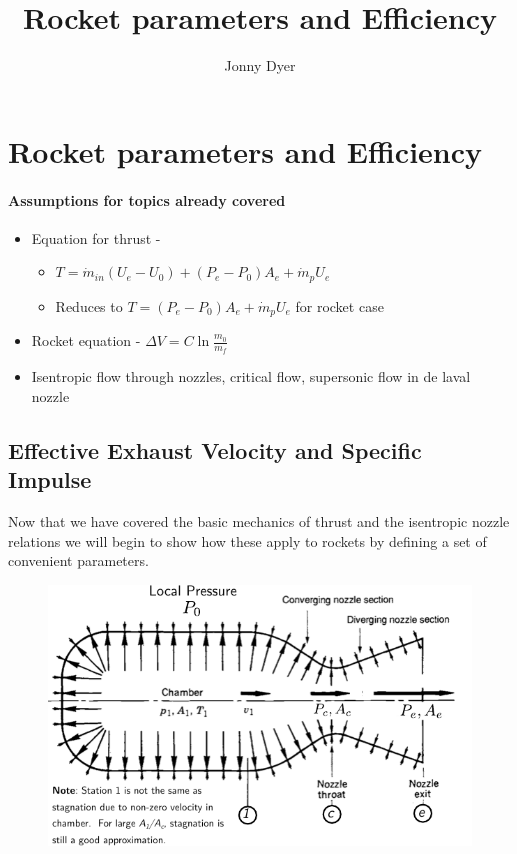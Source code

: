\documentclass[twocolumn]{memoir} %
\title{Rocket parameters and Efficiency}
\author{Jonny Dyer}
\begin{document}
\chapter*{Rocket parameters and Efficiency}

\subsubsection{Assumptions for topics already
covered}\label{assumptions-for-topics-already-covered}

\begin{itemize}
\item
  Equation for thrust -

  \begin{itemize}
  \item
    $T = \dot{m}_{in}(U_e - U_0) + (P_e - P_0)A_e + \dot{m}_pU_e$
  \item
    Reduces to $T = (P_e - P_0)A_e + \dot{m}_pU_e$ for rocket case
  \end{itemize}
\item
  Rocket equation - $\Delta V = C \ln \frac{m_0}{m_f}$
\item
  Isentropic flow through nozzles, critical flow, supersonic flow in de
  laval nozzle
\end{itemize}

\section{Effective Exhaust Velocity and Specific Impulse}\label{c-and-isp}

Now that we have covered the basic mechanics of thrust and the
isentropic nozzle relations we will begin to show how these apply to
rockets by defining a set of convenient parameters.

\begin{figure}[H]
    \centering
    \includegraphics*[width=0.95\columnwidth]{imgs/nozzle_pressure}
\end{figure}
\end{document}
